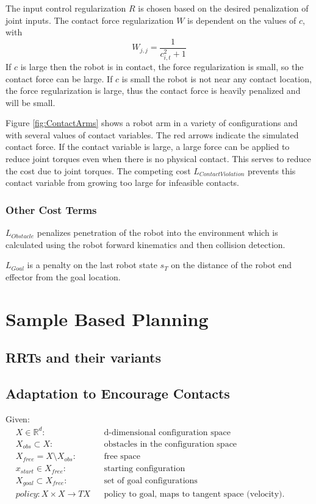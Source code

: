 \documentclass[../thesis.tex]{subfiles}
\begin{document}
The input control regularization $R$ is chosen based on the desired penalization of joint inputs. The contact force regularization $W$ is dependent on the values of $c$, with 
$$W_{j,j} = \frac{1}{c_{i,t}^2 + 1}$$
If $c$ is large then the robot is in contact, the force regularization is small, so the contact force can be large. If $c$ is small the robot is not near any contact location, the force regularization is large, thus the contact force is heavily penalized and will be small.

Figure \ref{fig:ContactArms} shows a robot arm in a variety of configurations and with several values of contact variables.
The red arrows indicate the simulated contact force.
If the contact variable is large, a large force can be applied to reduce joint torques even when there is no physical contact.
This serves to reduce the cost due to joint torques.
The competing cost $L_{Contact Violation}$ prevents this contact variable from growing too large for infeasible contacts.




\subsubsection{Other Cost Terms}
$L_{Obstacle}$ penalizes penetration of the robot into the environment which is calculated using the robot forward kinematics and then collision detection.

$L_{Goal}$ is a penalty on the last robot state $s_T$ on the distance of the robot end effector from the goal location.





\section{Sample Based Planning} \label{sec:sample_planning}
\subsection{RRTs and their variants}
\subsection{Adaptation to Encourage Contacts}
Given:
\begin{align*}
    &X \in \mathbb{R}^d:     &&\text{d-dimensional configuration space}\\
    &X_{obs} \subset X:      &&\text{obstacles in the configuration space}\\
    &X_{free} = X \setminus X_{obs}:   &&\text{free space}\\
    &x_{start} \in X_{free}:  &&\text{starting configuration}\\
    &X_{goal} \subset X_{free}: &&\text{set of goal configurations}\\
    &policy: X \times X \rightarrow TX &&\text{policy to goal, maps to tangent space (velocity).  Previous formulation was wrong, as need to be able to follow the policy to an arbitrary point in X, not just a goal configuration}
\end{align*}
\end{document}
